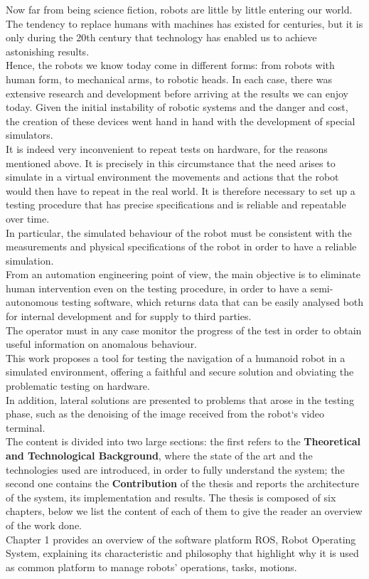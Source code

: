 Now far from being science fiction, robots are little by little entering our world. The tendency to replace humans with machines has existed for centuries, but it is only during the 20th century that technology has enabled us to achieve astonishing results.\\
Hence, the robots we know today come in different forms: from robots with human form, to mechanical arms, to robotic heads. 
In each case, there was extensive research and development before arriving at the results we can enjoy today.
Given the initial instability of robotic systems and the danger and cost, the creation of these devices went hand in hand with the development of special simulators. \\
It is indeed very inconvenient to repeat tests on hardware, for the reasons mentioned above. It is precisely in this circumstance that the need arises to simulate in a virtual environment the movements and actions that the robot would then have to repeat in the real world.
It is therefore necessary to set up a testing procedure that has precise specifications and is reliable and repeatable over time. \\
In particular, the simulated behaviour of the robot must be consistent with the measurements and physical specifications of the robot in order to have a reliable simulation.\\
From an automation engineering point of view, the main objective is to eliminate human intervention even on the testing procedure, in order to have a semi-autonomous testing software, which returns data that can be easily analysed both for internal development and for supply to third parties.\\
The operator must in any case monitor the progress of the test in order to obtain useful information on anomalous behaviour. \\

This work proposes a tool for testing the navigation of a humanoid robot in a simulated environment, offering a faithful and secure solution and obviating the problematic testing on hardware.\\

In addition, lateral solutions are presented to problems that arose in the testing phase, such as the denoising of the image received from the robot`s video terminal.\\

The content is divided into two large sections: the first refers to the \textbf{Theoretical and Technological Background}, where the state of the art and the technologies used are introduced, in order to fully understand the system; the second one contains the \textbf{Contribution} of the thesis and
reports the architecture of the system, its implementation and results.
The thesis is composed of six chapters, below we list the content of each of them to give
the reader an overview of the work done.\\
\newline
Chapter 1 provides an overview of the software platform ROS, Robot Operating
System, explaining its characteristic and philosophy that highlight why it is used as
common platform to manage robots’ operations, tasks, motions.

